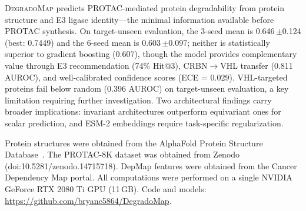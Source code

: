 \documentclass[sigconf]{acmart}
\newcommand{\ours}{\textsc{DegradoMap}}
\newcommand{\spm}[1]{{\scriptsize$\pm$#1}}
\begin{document}
\ours{} predicts PROTAC-mediated protein degradability from protein structure and E3 ligase identity---the minimal information available before PROTAC synthesis.
On target-unseen evaluation, the 3-seed mean is 0.646\,\spm{0.124} (best: 0.7449) and the 6-seed mean is 0.603\,\spm{0.097}; neither is statistically superior to gradient boosting (0.607), though the model provides complementary value through E3 recommendation (74\% Hit@3), CRBN$\to$VHL transfer (0.811 AUROC), and well-calibrated confidence scores (ECE = 0.029).
VHL-targeted proteins fail below random (0.396 AUROC) on target-unseen evaluation, a key limitation requiring further investigation.
Two architectural findings carry broader implications: invariant architectures outperform equivariant ones for scalar prediction, and ESM-2 embeddings require task-specific regularization.



\begin{acks}
Protein structures were obtained from the AlphaFold Protein Structure Database~\cite{jumper2021alphafold}.
The PROTAC-8K dataset was obtained from Zenodo (doi:10.5281/zenodo.14715718).
DepMap features were obtained from the Cancer Dependency Map portal.
All computations were performed on a single NVIDIA GeForce RTX 2080 Ti GPU (11\,GB).
Code and models: \url{https://github.com/bryanc5864/DegradoMap}.
\end{acks}


\end{document}
